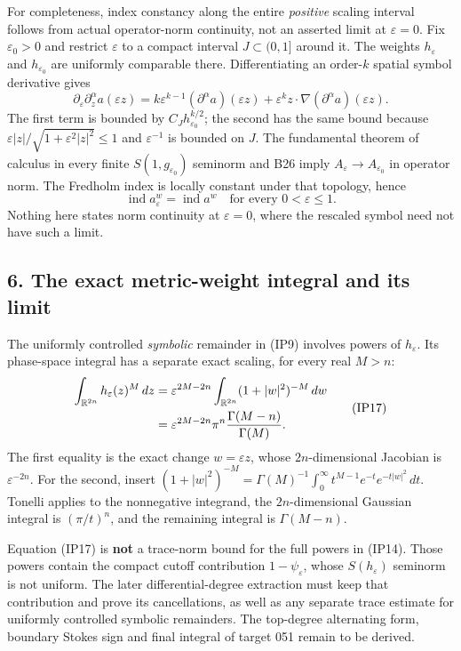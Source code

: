 \documentclass[
  11pt,
]{article}
\begin{document}
For completeness, index constancy along the entire \emph{positive}
scaling interval follows from actual operator-norm continuity, not an
asserted limit at \(\varepsilon=0\). Fix \(\varepsilon_0>0\) and
restrict \(\varepsilon\) to a compact interval \(J\subset(0,1]\) around
it. The weights \(h_\varepsilon\) and \(h_{\varepsilon_0}\) are
uniformly comparable there. Differentiating an order-\(k\) spatial
symbol derivative gives \[
 \partial_\varepsilon\partial_z^\alpha a(\varepsilon z)
 =k\varepsilon^{k-1}(\partial^\alpha a)(\varepsilon z)
  +\varepsilon^k
       z\cdot\nabla(\partial^\alpha a)(\varepsilon z).
 \tag{IP15}
\] The first term is bounded by \(C_Jh_{\varepsilon_0}^{k/2}\); the
second has the same bound because
\(\varepsilon|z|/\sqrt{1+\varepsilon^2|z|^2}\le1\) and
\(\varepsilon^{-1}\) is bounded on \(J\). The fundamental theorem of
calculus in every finite \(S(1,g_{\varepsilon_0})\) seminorm and B26
imply \(A_\varepsilon\to A_{\varepsilon_0}\) in operator norm. The
Fredholm index is locally constant under that topology, hence \[
 \operatorname{ind}a_\varepsilon^w
       =\operatorname{ind}a^w
       \quad\text{for every }0<\varepsilon\le1.
 \tag{IP16}
\] Nothing here states norm continuity at \(\varepsilon=0\), where the
rescaled symbol need not have such a limit.

\subsection{6. The exact metric-weight integral and its
limit}\label{the-exact-metric-weight-integral-and-its-limit}

The uniformly controlled \emph{symbolic} remainder in (IP9) involves
powers of \(h_\varepsilon\). Its phase-space integral has a separate
exact scaling, for every real \(M>n\): \[
 \begin{aligned}
 \int_{\mathbb R^{2n}}h_\varepsilon(z)^M\,dz
 &=\varepsilon^{2M-2n}
   \int_{\mathbb R^{2n}}(1+|w|^2)^{-M}\,dw\\
 &=\varepsilon^{2M-2n}
       \pi^n{\Gamma(M-n)\over\Gamma(M)}.
 \end{aligned}
 \tag{IP17}
\] The first equality is the exact change \(w=\varepsilon z\), whose
\(2n\)-dimensional Jacobian is \(\varepsilon^{-2n}\). For the second,
insert \((1+|w|^2)^{-M}=\Gamma(M)^{-1}
\int_0^\infty t^{M-1}e^{-t}e^{-t|w|^2}\,dt\). Tonelli applies to the
nonnegative integrand, the \(2n\)-dimensional Gaussian integral is
\((\pi/t)^n\), and the remaining integral is \(\Gamma(M-n)\).

Equation (IP17) is \textbf{not} a trace-norm bound for the full powers
in (IP14). Those powers contain the compact cutoff contribution
\(1-\psi_\varepsilon\), whose \(S(h_\varepsilon)\) seminorm is not
uniform. The later differential-degree extraction must keep that
contribution and prove its cancellations, as well as any separate trace
estimate for uniformly controlled symbolic remainders. The top-degree
alternating form, boundary Stokes sign and final integral of target 051
remain to be derived.
\end{document}
